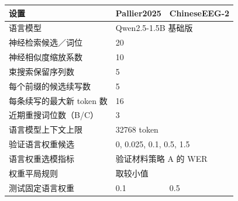 \begingroup
\papertablestyle
\begin{tabular}{@{}lll@{}}
\toprule
设置 & Pallier2025 & ChineseEEG-2 \\
\midrule
语言模型 & \multicolumn{2}{l}{Qwen2.5-1.5B 基础版} \\
神经检索候选／词位 & \multicolumn{2}{l}{20} \\
神经相似度缩放系数 & \multicolumn{2}{l}{10} \\
束搜索保留序列数 & \multicolumn{2}{l}{5} \\
每个前缀的候选续写数 & \multicolumn{2}{l}{5} \\
每条续写的最大新 token 数 & \multicolumn{2}{l}{16} \\
近期重搜词位数（B/C） & \multicolumn{2}{l}{3} \\
语言模型上下文上限 & \multicolumn{2}{l}{32768 token} \\
验证语言权重候选 & \multicolumn{2}{l}{0, 0.025, 0.1, 0.5, 1.5} \\
语言权重选模指标 & \multicolumn{2}{l}{验证材料策略 A 的 WER} \\
权重平局规则 & \multicolumn{2}{l}{取较小值} \\
\midrule
测试固定语言权重 & 0.1 & 0.5 \\
\bottomrule
\end{tabular}
\endgroup

